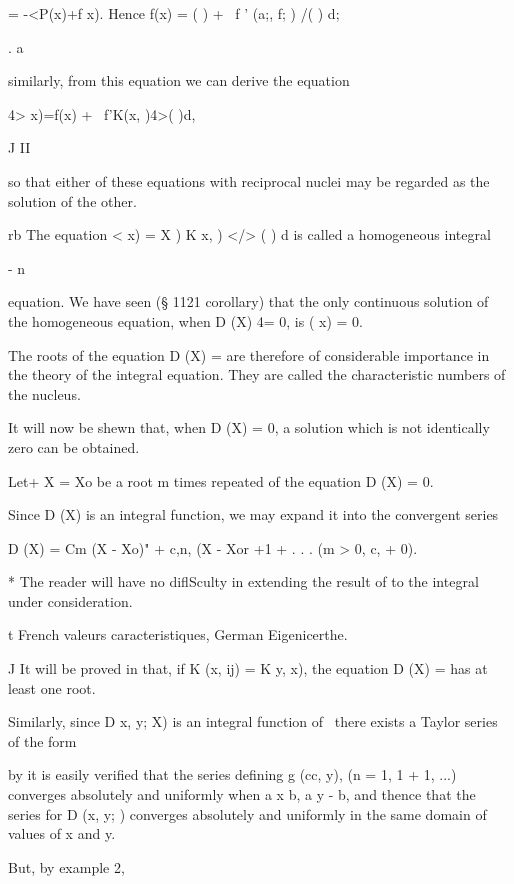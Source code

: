 = -<P(x)+f x). Hence f(x) = ( ) + \ f ' (a;, f; ) /( ) d;

. a

similarly, from this equation we can derive the equation

4> x)=f(x) + \ f'K(x, )4>( )d,

J II

so that either of these equations with reciprocal nuclei may be
regarded as the solution of the other.


rb The equation < x) = X ) K x, ) </> ( ) d is called a homogeneous
integral

- n

equation. We have seen (§ 1121 corollary) that the only continuous
solution of the homogeneous equation, when D (X) 4= 0, is ( x) = 0.

The roots of the equation D (X) = are therefore of considerable
importance in the theory of the integral equation. They are called the
characteristic numbers of the nucleus.

It will now be shewn that, when D (X) = 0, a solution which is not
identically zero can be obtained.

Let+ X = Xo be a root m times repeated of the equation D (X) = 0.

Since D (X) is an integral function, we may expand it into the
convergent series

D (X) = Cm (X - Xo)" + c,n, (X - Xor +1 + . . . (m > 0, c, + 0).

* The reader will have no diflSculty in extending the result of
to the integral under consideration.

t French valeurs caracteristiques, German Eigenicerthe.

J It will be proved in that, if K (x, ij) = K y, x), the
equation D (X) = has at least one root.

%
%

Similarly, since D x, y; X) is an integral function of \, there
exists a Taylor series of the form

by it is easily verified that the series defining g (cc, y), (n
= 1, 1 + 1, ...) converges absolutely and uniformly when a x b, a y -
b, and thence that the series for D (x, y; ) converges absolutely and
uniformly in the same domain of values of x and y.

But, by example 2,

